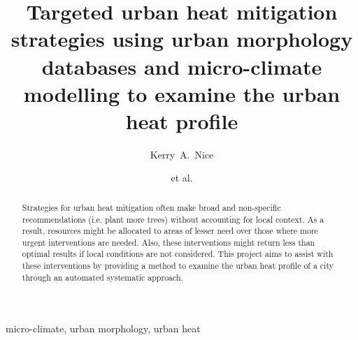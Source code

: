 \documentclass[final,3p,times,authoryear]{elsarticle}
\begin{document}

\title{Targeted urban heat mitigation strategies using urban morphology databases and micro-climate modelling to examine the urban heat profile}

\author[melb]{Kerry~A.~Nice}
\author[melb]{et al.}
\address[melb]{Transport, Health, and Urban Design Hub, Faculty of Architecture, Building, and Planning, University of Melbourne, Australia.}







\begin{abstract}

Strategies for urban heat mitigation often make broad and non-specific recommendations (i.e. plant more trees) without accounting for local context. As a result, resources might be allocated to areas of lesser need over those where more urgent interventions are needed. Also, these interventions might return less than optimal results if local conditions are not considered. This project aims to assist with these interventions by providing a method to examine the urban heat profile of a city through an automated systematic approach. 
\end{abstract}

\begin{keyword}
micro-climate\sep 
urban morphology\sep
urban heat
\end{keyword}



\maketitle
\end{document}
